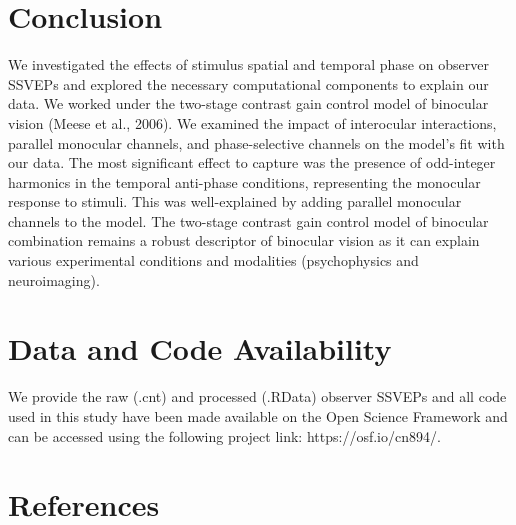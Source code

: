 \documentclass[
  12pt,
]{article}
\begin{document}
\section{Conclusion}\label{conclusion}

We investigated the effects of stimulus spatial and temporal phase on
observer SSVEPs and explored the necessary computational components to
explain our data. We worked under the two-stage contrast gain control
model of binocular vision (Meese et al., 2006). We examined the impact
of interocular interactions, parallel monocular channels, and
phase-selective channels on the model's fit with our data. The most
significant effect to capture was the presence of odd-integer harmonics
in the temporal anti-phase conditions, representing the monocular
response to stimuli. This was well-explained by adding parallel
monocular channels to the model. The two-stage contrast gain control
model of binocular combination remains a robust descriptor of binocular
vision as it can explain various experimental conditions and modalities
(psychophysics and neuroimaging).

\section{Data and Code Availability}\label{data-and-code-availability}

We provide the raw (.cnt) and processed (.RData) observer SSVEPs and all
code used in this study have been made available on the Open Science
Framework and can be accessed using the following project link:
https://osf.io/cn894/.

\section*{References}\label{references}
\end{document}
